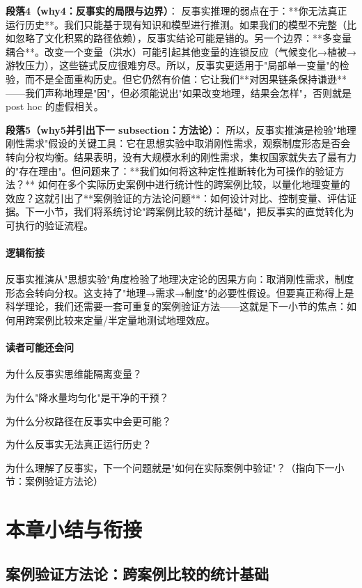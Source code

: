 \documentclass[openany, a4paper, 12pt]{book}
\begin{document}
\textbf{段落4（why4：反事实的局限与边界）}：  
反事实推理的弱点在于：**你无法真正运行历史**。我们只能基于现有知识和模型进行推测。如果我们的模型不完整（比如忽略了文化积累的路径依赖），反事实结论可能是错的。另一个边界：**多变量耦合**。改变一个变量（洪水）可能引起其他变量的连锁反应（气候变化→植被→游牧压力），这些链式反应很难穷尽。所以，反事实更适用于"局部单一变量"的检验，而不是全面重构历史。但它仍然有价值：它让我们**对因果链条保持谦逊**——我们声称地理是"因"，但必须能说出"如果改变地理，结果会怎样"，否则就是 post hoc 的虚假相关。

\textbf{段落5（why5并引出下一 subsection：方法论）}：  
所以，反事实推演是检验"地理刚性需求"假设的关键工具：它在思想实验中取消刚性需求，观察制度形态是否会转向分权均衡。结果表明，没有大规模水利的刚性需求，集权国家就失去了最有力的"存在理由"。但问题来了：**我们如何将这种定性推断转化为可操作的验证方法？** 如何在多个实际历史案例中进行统计性的跨案例比较，以量化地理变量的效应？这就引出了**案例验证的方法论问题**：如何设计对比、控制变量、评估证据。下一小节，我们将系统讨论"跨案例比较的统计基础"，把反事实的直觉转化为可执行的验证流程。

\paragraph*{逻辑衔接}
反事实推演从"思想实验"角度检验了地理决定论的因果方向：取消刚性需求，制度形态会转向分权。这支持了"地理→需求→制度"的必要性假设。但要真正称得上是科学理论，我们还需要一套可重复的案例验证方法——这就是下一小节的焦点：如何用跨案例比较来定量/半定量地测试地理效应。

\paragraph*{读者可能还会问}
\item 为什么反事实思维能隔离变量？
\item 为什么"降水量均匀化"是干净的干预？
\item 为什么分权路径在反事实中会更可能？
\item 为什么反事实无法真正运行历史？
\item 为什么理解了反事实，下一个问题就是"如何在实际案例中验证"？（指向下一小节：案例验证方法论）

	\section{本章小结与衔接}
	
	\subsection{案例验证方法论：跨案例比较的统计基础}
\end{document}

